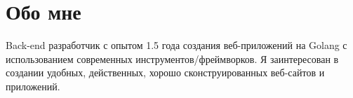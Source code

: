 \documentclass[letterpaper,11pt]{article}
\begin{document}
\section{Обо мне}
\begin{itemize}[leftmargin=0.15in, label={}]
\small{\item{Back-end разработчик с опытом 1.5 года создания веб-приложений на Golang с использованием современных инструментов/фреймворков. Я заинтересован в создании удобных, действенных, хорошо сконструированных веб-сайтов и приложений.} \
}
\end{itemize}

\end{document}
